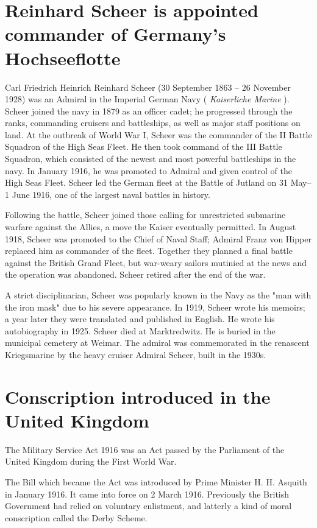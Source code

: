 \documentclass[a4paper,]{book}
\begin{document}
\section{Reinhard Scheer is appointed commander of Germany's Hochseeflotte}

Carl Friedrich Heinrich Reinhard Scheer (30 September 1863 – 26 November 1928) was an Admiral in the Imperial German Navy ( \textit{Kaiserliche Marine} ). Scheer joined the navy in 1879 as an officer cadet; he progressed through the ranks, commanding cruisers and battleships, as well as major staff positions on land. At the outbreak of World War I, Scheer was the commander of the II Battle Squadron of the High Seas Fleet. He then took command of the III Battle Squadron, which consisted of the newest and most powerful battleships in the navy. In January 1916, he was promoted to Admiral and given control of the High Seas Fleet. Scheer led the German fleet at the Battle of Jutland on 31 May–1 June 1916, one of the largest naval battles in history.

Following the battle, Scheer joined those calling for unrestricted submarine warfare against the Allies, a move the Kaiser eventually permitted. In August 1918, Scheer was promoted to the Chief of Naval Staff; Admiral Franz von Hipper replaced him as commander of the fleet. Together they planned a final battle against the British Grand Fleet, but war-weary sailors mutinied at the news and the operation was abandoned. Scheer retired after the end of the war.

A strict disciplinarian, Scheer was popularly known in the Navy as the "man with the iron mask" due to his severe appearance. In 1919, Scheer wrote his memoirs; a year later they were translated and published in English. He wrote his autobiography in 1925. Scheer died at Marktredwitz. He is buried in the municipal cemetery at Weimar. The admiral was commemorated in the renascent Kriegsmarine by the heavy cruiser Admiral Scheer, built in the 1930s. 

\section{Conscription introduced in the United Kingdom}

The Military Service Act 1916 was an Act passed by the Parliament of the United Kingdom during the First World War.

The Bill which became the Act was introduced by Prime Minister H. H. Asquith in January 1916. It came into force on 2 March 1916. Previously the British Government had relied on voluntary enlistment, and latterly a kind of moral conscription called the Derby Scheme.
\end{document}
